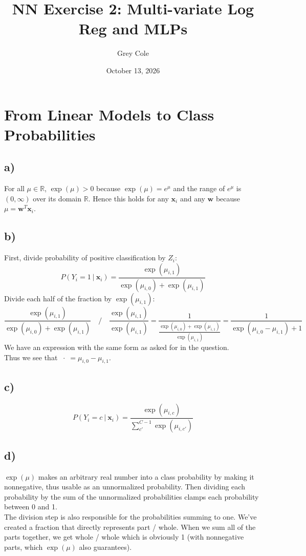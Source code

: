 \documentclass{article}
\title{NN Exercise 2: Multi-variate Log Reg and MLPs}
\date{October 13, 2026}
\author{Grey Cole}
\renewcommand{\vec}[1]{%
	\bm{#1}%
}
\newcommand{\gv}{%
	\:|\:
}
\begin{document}
	\maketitle
	
	\section{From Linear Models to Class Probabilities}
	\subsection*{a)}
	For all $\mu \in \mathbb{R}$, $\exp(\mu) > 0$ because $\exp(\mu) = e^{\mu}$ and the range of $e^{\mu}$ is $(0, \infty)$ over its domain $\mathbb{R}$. Hence this holds for any $\vec{x}_i$ and any $\vec{w}$ because $\mu = \vec{w}^T\vec{x}_i$.
	
	\subsection*{b)}
	First, divide probability of positive classification by $Z_i$:
	\[
		P(Y_i = 1 \gv \vec{x}_i) = \frac{\exp(\mu_{i,1})}{\exp(\mu_{i,0}) + \exp(\mu_{i,1})}
	\]
	Divide each half of the fraction by $\exp(\mu_{i,1})$:
	\[
		\frac{\exp(\mu_{i,1})}{\exp(\mu_{i,0}) + \exp(\mu_{i,1})}
		\quad/\quad \frac{\exp(\mu_{i,1})}{\exp(\mu_{i,1})} =
		\frac{1}{\frac{\exp(\mu_{i,0}) + \exp(\mu_{i,1})}{\exp(\mu_{i,1})}}
		= \frac{1}{\exp(\mu_{i,0} - \mu_{i,1}) + 1}
	\]
	We have an expression with the same form as asked for in the question.\\Thus we see that $\;\cdot\; = \mu_{i,0} - \mu_{i,1}$.
	
	\subsection*{c)}
	\[
		P(Y_i = c \gv \vec{x}_i) = \frac{\exp(\mu_{i,c})}{\sum_{c'}^{C-1} \exp(\mu_{i,c'})}
	\]
	
	\subsection*{d)}
	$\exp(\mu)$ makes an arbitrary real number into a class probability by making it nonnegative, thus usable as an unnormalized probability. Then dividing each probability by the sum of the unnormalized probabilities clamps each probability between 0 and 1.\\
	The division step is also responsible for the probabilities summing to one. We've created a fraction that directly represents part / whole. When we sum all of the parts together, we get whole / whole which is obviously 1 (with nonnegative parts, which $\exp(\mu)$ also guarantees).
	
\end{document}
